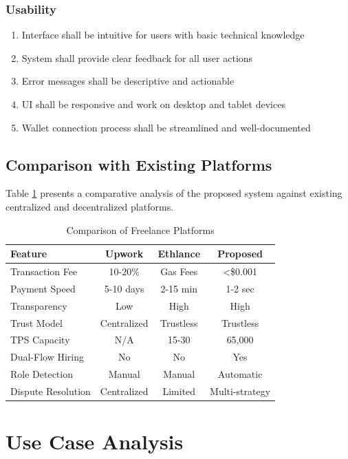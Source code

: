 \documentclass[a4paper,13pt,twoside]{report}
\theoremstyle{definition}
\begin{document}
\subsubsection{Usability}

\begin{enumerate}
    \item Interface shall be intuitive for users with basic technical knowledge
    \item System shall provide clear feedback for all user actions
    \item Error messages shall be descriptive and actionable
    \item UI shall be responsive and work on desktop and tablet devices
    \item Wallet connection process shall be streamlined and well-documented
\end{enumerate}

\subsection{Comparison with Existing Platforms}

Table \ref{tab:platform_comparison} presents a comparative analysis of the proposed system against existing centralized and decentralized platforms.

\begin{table}[h]
\centering
\caption{Comparison of Freelance Platforms}
\label{tab:platform_comparison}
\begin{tabular}{|l|c|c|c|}
\hline
\textbf{Feature} & \textbf{Upwork} & \textbf{Ethlance} & \textbf{Proposed} \\
\hline
Transaction Fee & 10-20\% & Gas Fees & <\$0.001 \\
Payment Speed & 5-10 days & 2-15 min & 1-2 sec \\
Transparency & Low & High & High \\
Trust Model & Centralized & Trustless & Trustless \\
TPS Capacity & N/A & 15-30 & 65,000 \\
Dual-Flow Hiring & No & No & Yes \\
Role Detection & Manual & Manual & Automatic \\
Dispute Resolution & Centralized & Limited & Multi-strategy \\
\hline
\end{tabular}
\end{table}

\section{Use Case Analysis}
\end{document}
